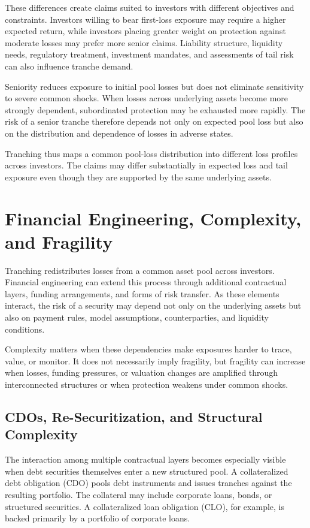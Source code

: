 These differences create claims suited to investors with different objectives and constraints. Investors willing to bear first-loss exposure may require a higher expected return, while investors placing greater weight on protection against moderate losses may prefer more senior claims. Liability structure, liquidity needs, regulatory treatment, investment mandates, and assessments of tail risk can also influence tranche demand.

Seniority reduces exposure to initial pool losses but does not eliminate sensitivity to severe common shocks. When losses across underlying assets become more strongly dependent, subordinated protection may be exhausted more rapidly. The risk of a senior tranche therefore depends not only on expected pool loss but also on the distribution and dependence of losses in adverse states.

Tranching thus maps a common pool-loss distribution into different loss profiles across investors. The claims may differ substantially in expected loss and tail exposure even though they are supported by the same underlying assets.

\section{Financial Engineering, Complexity, and Fragility}

Tranching redistributes losses from a common asset pool across investors. Financial engineering can extend this process through additional contractual layers, funding arrangements, and forms of risk transfer. As these elements interact, the risk of a security may depend not only on the underlying assets but also on payment rules, model assumptions, counterparties, and liquidity conditions.

Complexity matters when these dependencies make exposures harder to trace, value, or monitor. It does not necessarily imply fragility, but fragility can increase when losses, funding pressures, or valuation changes are amplified through interconnected structures or when protection weakens under common shocks.

\subsection[CDOs, Re-Securitization, and Structural Complexity]{CDOs, Re-Securitization, and Structural Complexity}

The interaction among multiple contractual layers becomes especially visible when debt securities themselves enter a new structured pool. A collateralized debt obligation (CDO) pools debt instruments and issues tranches against the resulting portfolio. The collateral may include corporate loans, bonds, or structured securities. A collateralized loan obligation (CLO), for example, is backed primarily by a portfolio of corporate loans.

